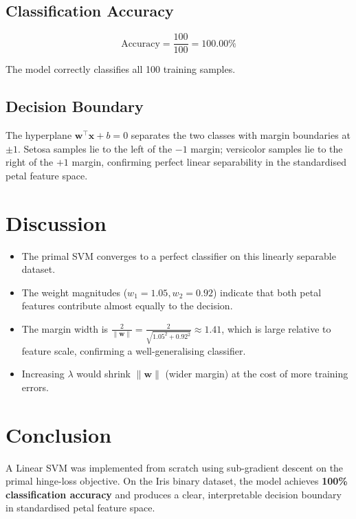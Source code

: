\documentclass[12pt,a4paper]{article}
\begin{document}
\subsection{Classification Accuracy}

\begin{equation*}
  \text{Accuracy} = \frac{100}{100} = \mathbf{100.00\%}
\end{equation*}

The model correctly classifies all 100 training samples.

\subsection{Decision Boundary}

The hyperplane $\mathbf{w}^\top\mathbf{x} + b = 0$ separates the two classes with margin boundaries at $\pm 1$.
Setosa samples lie to the left of the $-1$ margin; versicolor samples lie to the right of the $+1$ margin,
confirming perfect linear separability in the standardised petal feature space.

\section{Discussion}

\begin{itemize}
  \item The primal SVM converges to a perfect classifier on this linearly separable dataset.
  \item The weight magnitudes ($w_1 = 1.05, w_2 = 0.92$) indicate that both petal features contribute almost equally to the decision.
  \item The margin width is $\frac{2}{\|\mathbf{w}\|} = \frac{2}{\sqrt{1.05^2 + 0.92^2}} \approx 1.41$, which is large relative to feature scale, confirming a well-generalising classifier.
  \item Increasing $\lambda$ would shrink $\|\mathbf{w}\|$ (wider margin) at the cost of more training errors.
\end{itemize}

\section{Conclusion}

A Linear SVM was implemented from scratch using sub-gradient descent on the primal hinge-loss objective. On the Iris binary dataset, the model achieves \textbf{100\% classification accuracy} and produces a clear, interpretable decision boundary in standardised petal feature space.
\end{document}
